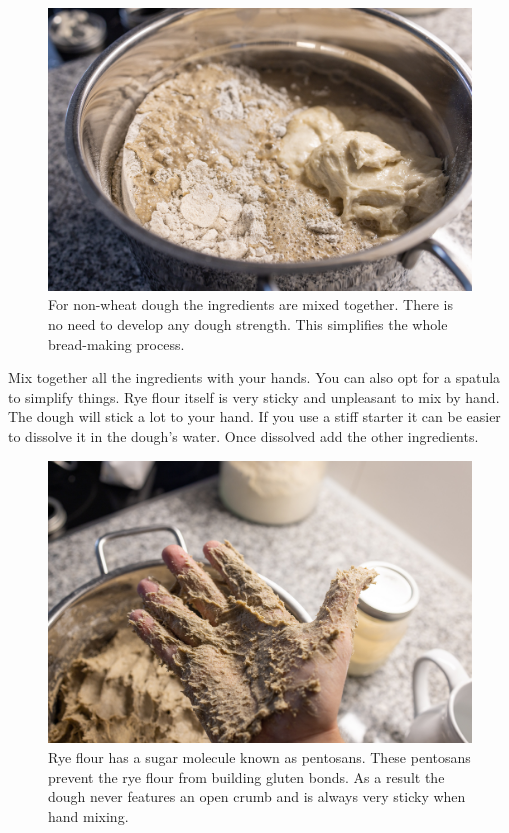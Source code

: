 \begin{figure}[!htb]
  \includegraphics[width=\textwidth]{ingredients}
  \caption{For non-wheat dough the ingredients are mixed together. There is no need
  to develop any dough strength. This simplifies the whole bread-making process.}
  \label{fig:non-wheat-ingredients}
\end{figure}

Mix together all the ingredients with your hands. You can also
opt for a spatula to simplify things. Rye flour itself is very
sticky and unpleasant to mix by hand. The dough will stick
a lot to your hand. If you use a stiff starter it can be
easier to dissolve it in the dough's water. Once dissolved
add the other ingredients.

\begin{figure}[!htb]
  \includegraphics[width=\textwidth]{sticky-hands}
  \caption{Rye flour has a sugar molecule known as pentosans. These pentosans prevent
  the rye flour from building gluten bonds. As a result the dough never features an
  open crumb and is always very sticky when hand mixing.}
  \label{fig:non-wheat-sticky-hands}
\end{figure}

